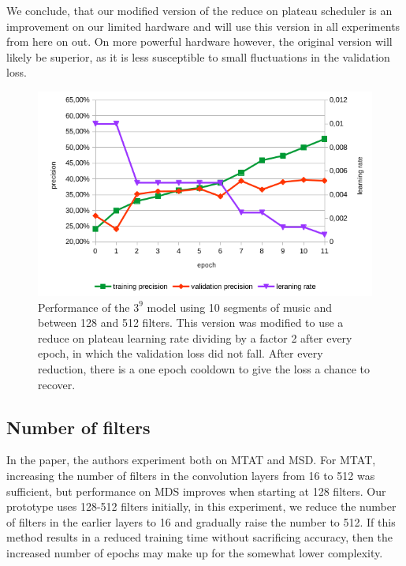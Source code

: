 We conclude, that our modified version of the reduce on plateau scheduler is an improvement on our limited hardware and will use this version in all experiments from here on out. On more powerful hardware however, the original version will likely be superior, as it is less susceptible to small fluctuations in the validation loss.


\begin{figure}[!htb]
	\centering
	\includegraphics[width=.9\linewidth]{images/sample-dcnn-m3-n9-seg10-128_512-plateau_mod.png}
	\caption{Performance of the $3^9$ model using 10 segments of music and between 128 and 512 filters. This version was modified to use a reduce on plateau learning rate dividing by a factor 2 after every epoch, in which the validation loss did not fall. After every reduction, there is a one epoch cooldown to give the loss a chance to recover.}
	\label{fig:sample-dcnn-m3-n9-seg10-128_512-plateau_mod}
\end{figure}


\subsection{Number of filters}

In the paper, the authors experiment both on MTAT and MSD. For MTAT, increasing the number of filters in the convolution layers from 16 to 512 was sufficient, but performance on MDS improves when starting at 128 filters. Our prototype uses 128-512 filters initially, in this experiment, we reduce the number of filters in the earlier layers to 16 and gradually raise the number to 512. If this method results in a reduced training time without sacrificing accuracy, then the increased number of epochs may make up for the somewhat lower complexity.

